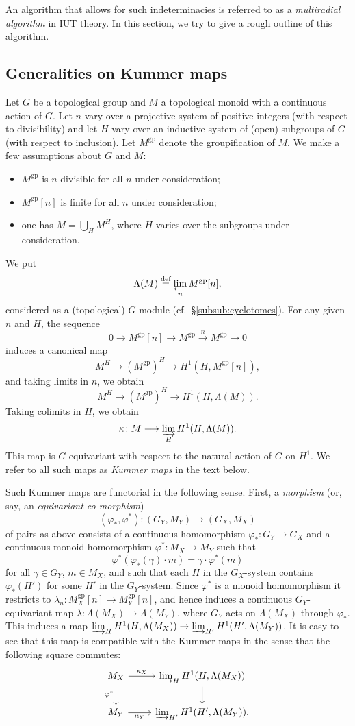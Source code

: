 \documentclass[12pt, reqno, a4paper]{amsart}
\def\longto{\longrightarrow}
\def\eqdef{\stackrel{\textrm{def}}{=}} %
\def\gp{\mathrm{gp}}
\begin{document}
An algorithm that allows for such indeterminacies is referred to as a {\it multiradial algorithm} in IUT theory.
In this section, we try to give a rough outline of this algorithm.


\subsection{Generalities on Kummer maps}\label{sub:kummer_generalities}
Let $G$ be a topological group and $M$ a topological monoid with a continuous action of $G$.
Let $n$ vary over a projective system of positive integers (with respect to divisibility) and let $H$ vary over an inductive system of (open) subgroups of $G$ (with respect to inclusion).
Let $M^{\gp}$ denote the groupification of $M$.
We make a few assumptions about $G$ and $M$:
\begin{itemize}
  \item[(a)] $M^{\gp}$ is $n$-divisible for all $n$ under consideration;
  \item[(b)] $M^{\gp}[n]$ is finite for all $n$ under consideration;
  \item[(c)] one has $M = \bigcup_H M^H$, where $H$ varies over the subgroups under consideration.
\end{itemize}
We put 
\[ \Lambda(M) \eqdef \varprojlim_n M^{\gp}[n], \]
considered as a (topological) $G$-module (cf.\ \S\ref{subsub:cyclotomes}).
For any given $n$ and $H$, the sequence 
\[ 0 \to M^{\gp}[n] \to M^{\gp} \xrightarrow{n} M^{\gp} \to 0 \]
induces a canonical map 
\[ M^H \to (M^{\gp})^H \to H^1(H,M^{\gp}[n]), \]
and taking limits in $n$, we obtain
\[ M^H \to (M^{\gp})^H \to H^1(H,\Lambda(M)). \]
Taking colimits in $H$, we obtain
\[ \kappa\colon M \longto \varinjlim_H H^1(H,\Lambda(M)). \]
This map is $G$-equivariant with respect to the natural action of $G$ on $H^1$.
We refer to all such maps as \textit{Kummer maps} in the text below.

Such Kummer maps are functorial in the following sense. 
First, a \emph{morphism} (or, say, an {\it equivariant co-morphism})
\[ (\varphi_*,\varphi^*)\colon(G_Y,M_Y)\longto(G_X,M_X) \] 
of pairs as above consists of a continuous homomorphism
$\varphi_*\colon G_Y\to G_X$ and a continuous monoid homomorphism
$\varphi^*\colon M_X\to M_Y$ such that 
\[ \varphi^*(\varphi_*(\gamma)\cdot m)= \gamma\cdot\varphi^*(m)\] 
for all $\gamma\in G_Y$, $m\in M_X$, and such that each $H$ in the $G_X$-system contains
$\varphi_*(H')$ for some $H'$ in the $G_Y$-system.
Since $\varphi^*$ is a monoid homomorphism it restricts to $\lambda_n\colon M_X^{\gp}[n]\to M_Y^{\gp}[n]$, and hence induces a continuous $G_Y$-equivariant map $\lambda\colon\Lambda(M_X)\to\Lambda(M_Y)$, where $G_Y$ acts on $\Lambda(M_X)$ through $\varphi_*$.
This induces a map $\varinjlim_H H^1(H,\Lambda(M_X)) \to \varinjlim_{H'} H^1(H',\Lambda(M_Y))$.
It is easy to see that this map is compatible with the Kummer maps in the sense that the following square commutes:
\[
\begin{tikzcd}
M_X \arrow[r, "\kappa_X"] \arrow[d, "\varphi^*"'] &
  \varinjlim_H H^1(H,\Lambda(M_X)) \arrow[d] \\
M_Y \arrow[r, "\kappa_Y"'] &
  \varinjlim_{H'} H^1(H',\Lambda(M_Y)).
\end{tikzcd}
\]
\end{document}
